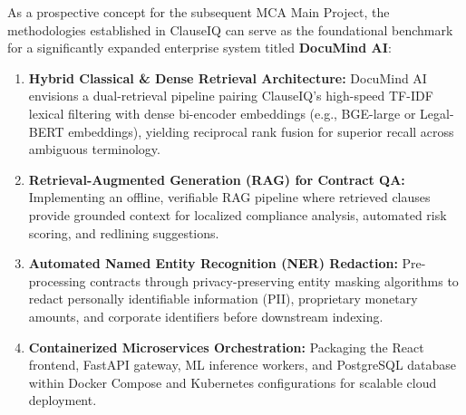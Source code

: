 As a prospective concept for the subsequent MCA Main Project, the methodologies established in ClauseIQ can serve as the foundational benchmark for a significantly expanded enterprise system titled \textbf{DocuMind AI}:
\begin{enumerate}
    \item \textbf{Hybrid Classical \& Dense Retrieval Architecture:} DocuMind AI envisions a dual-retrieval pipeline pairing ClauseIQ's high-speed TF-IDF lexical filtering with dense bi-encoder embeddings (e.g., BGE-large or Legal-BERT embeddings), yielding reciprocal rank fusion for superior recall across ambiguous terminology.
    \item \textbf{Retrieval-Augmented Generation (RAG) for Contract QA:} Implementing an offline, verifiable RAG pipeline where retrieved clauses provide grounded context for localized compliance analysis, automated risk scoring, and redlining suggestions.
    \item \textbf{Automated Named Entity Recognition (NER) Redaction:} Pre-processing contracts through privacy-preserving entity masking algorithms to redact personally identifiable information (PII), proprietary monetary amounts, and corporate identifiers before downstream indexing.
    \item \textbf{Containerized Microservices Orchestration:} Packaging the React frontend, FastAPI gateway, ML inference workers, and PostgreSQL database within Docker Compose and Kubernetes configurations for scalable cloud deployment.
\end{enumerate}
